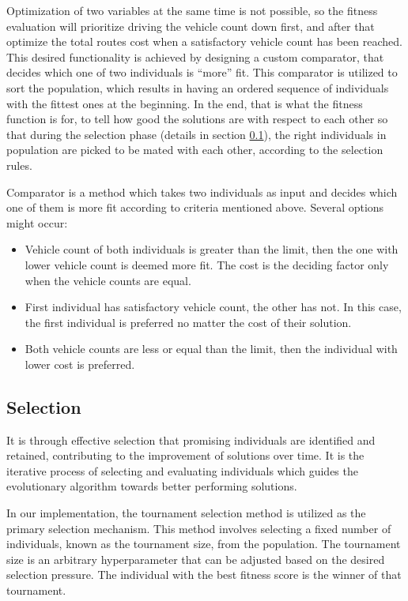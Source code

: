 \documentclass[twoside]{ctuthesis}
\theoremstyle{plain}
\theoremstyle{definition}
\theoremstyle{note}
\begin{document}
Optimization of two variables at the same time is not possible, so the fitness evaluation will prioritize driving the vehicle count down first, and after that optimize the total routes cost when a satisfactory vehicle count has been reached.
This desired functionality is achieved by designing a custom comparator, that decides which one of two individuals is ``more'' fit. This comparator is utilized to sort the population, which results in having an ordered sequence of individuals with the fittest ones at the beginning. In the end, that is what the fitness function is for, to tell how good the solutions are with respect to each other so that during the selection phase (details in section \ref{sec:selectioncarp}), the right individuals in population are picked to be mated with each other, according to the selection rules. 

Comparator is a method which takes two individuals as input and decides which one of them is more fit according to criteria mentioned above. Several options might occur:
\begin{itemize}
	\item Vehicle count of both individuals is greater than the limit, then the one with lower vehicle count is deemed more fit. The cost is the deciding factor only when the vehicle counts are equal.
	\item First individual has satisfactory vehicle count, the other has not. In this case, the first individual is preferred no matter the cost of their solution.
	\item Both vehicle counts are less or equal than the limit, then the individual with lower cost is preferred.
\end{itemize}

\subsection{Selection}
\label{sec:selectioncarp}
It is through effective selection that promising individuals are identified and retained, contributing to the improvement of solutions over time. It is the iterative process of selecting and evaluating individuals which guides the evolutionary algorithm towards better performing solutions.

In our implementation, the tournament selection method is utilized as the primary selection mechanism. This method involves selecting a fixed number of individuals, known as the tournament size, from the population. The tournament size is an arbitrary hyperparameter that can be adjusted based on the desired selection pressure. The individual with the best fitness score is the winner of that tournament.
\end{document}
